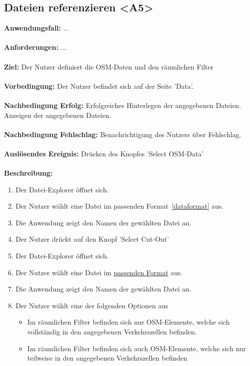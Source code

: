 \documentclass[parskip=full]{scrartcl} %
\begin{document}
\subsection*{Dateien referenzieren <A5>}
\textbf{Anwendungsfall:} ...\\\\
\textbf{Anforderungen:} ...\\\\
\textbf{Ziel:} Der Nutzer definiert die OSM-Daten und den räumlichen Filter\\\\
\textbf{Vorbedingung:} Der Nutzer befindet sich auf der Seite 'Data'. \\\\
\textbf{Nachbedingung Erfolg:} Erfolgreiches Hinterlegen der angegebenen Dateien. Anzeigen der angegebenen Dateien.\\\\
\textbf{Nachbedingung Fehlschlag:} Benachrichtigung des Nutzers über Fehlschlag. \\\\
\textbf{Auslösendes Ereignis:} Drücken des Knopfes 'Select OSM-Data'\\\\
\textbf{Beschreibung:}
\begin{enumerate}
    \item Der Datei-Explorer öffnet sich.
    \item Der Nutzer wählt eine Datei im {passenden Format}~\ref{dataformat} aus.
    \item Die Anwendung zeigt den Namen der gewählten Datei an.
    \item Der Nutzer drückt auf den Knopf 'Select Cut-Out'
    \item Der Datei-Explorer öffnet sich.
    \item Der Nutzer wählt eine Datei im \hyperlink{dataformat}{passenden Format} aus.
    \item Die Anwendung zeigt den Namen der gewählten Datei an.
    \item Der Nutzer wählt eine der folgenden Optionen aus
    \begin{itemize}
        \item Im räumlichen Filter befinden sich nur OSM-Elemente, welche sich vollständig in den angegebenen Verkehrszellen befinden.
        \item Im räumlichen Filter befinden sich auch OSM-Elemente, welche sich nur teilweise in den angegebenen Verkehrszellen befinden
    \end{itemize}
\end{enumerate}
\newpage
\end{document}
